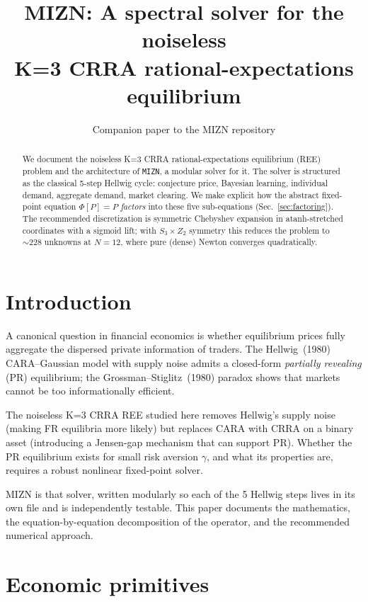 \documentclass[10pt,twocolumn,a4paper]{article}
\title{\textbf{MIZN}: A spectral solver for the noiseless\\
K=3 CRRA rational-expectations equilibrium}
\author{Companion paper to the MIZN repository}
\date{}
\begin{document}
\maketitle
\begin{abstract}
\noindent
We document the noiseless K=3 CRRA rational-expectations equilibrium (REE)
problem and the architecture of \texttt{MIZN}, a modular solver for it.
The solver is structured as the classical 5-step Hellwig cycle: conjecture
price, Bayesian learning, individual demand, aggregate demand, market
clearing. We make explicit how the abstract fixed-point equation
$\Phi[P] = P$ \emph{factors} into these five sub-equations
(Sec.~\ref{sec:factoring}). The recommended discretization is symmetric
Chebyshev expansion in atanh-stretched coordinates with a sigmoid lift;
with $S_3 \times Z_2$ symmetry this reduces the problem to $\sim 228$
unknowns at $N=12$, where pure (dense) Newton converges quadratically.
\end{abstract}

\section{Introduction}

A canonical question in financial economics is whether equilibrium prices
fully aggregate the dispersed private information of traders. The
Hellwig~(1980) CARA--Gaussian model with supply noise admits a closed-form
\emph{partially revealing} (PR) equilibrium; the Grossman--Stiglitz~(1980)
paradox shows that markets cannot be too informationally efficient.

The noiseless K=3 CRRA REE studied here removes Hellwig's supply noise
(making FR equilibria more likely) but replaces CARA with CRRA on a binary
asset (introducing a Jensen-gap mechanism that can support PR). Whether the
PR equilibrium exists for small risk aversion $\gamma$, and what its
properties are, requires a robust nonlinear fixed-point solver.

MIZN is that solver, written modularly so each of the 5 Hellwig steps lives
in its own file and is independently testable. This paper documents the
mathematics, the equation-by-equation decomposition of the operator, and
the recommended numerical approach.

\section{Economic primitives}
\label{sec:econ}
\end{document}
